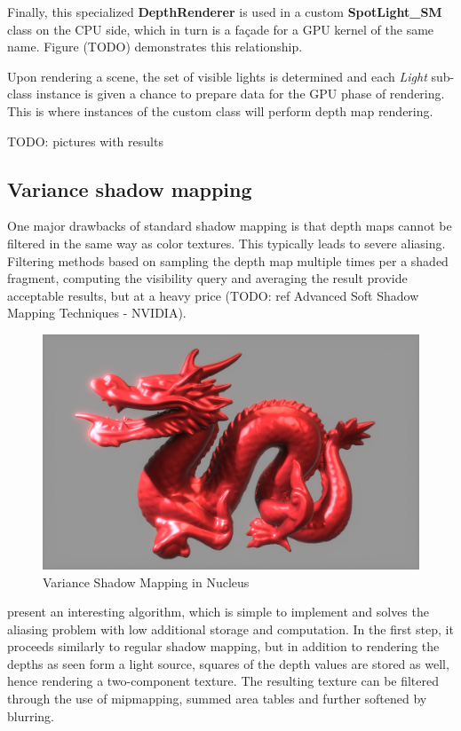Finally, this specialized \textbf{DepthRenderer} is used in a custom \textbf{SpotLight\_SM} class on the CPU side, which in turn is a façade for a GPU kernel of the same name. Figure (TODO) demonstrates this relationship.

Upon rendering a scene, the set of visible lights is determined and each \emph{Light} sub-class instance is given a chance to prepare data for the GPU phase of rendering. This is where instances of the custom class will perform depth map rendering.

TODO: pictures with results

\subsection{Variance shadow mapping}

One major drawbacks of standard shadow mapping is that depth maps cannot be filtered in the same way as color textures. This typically leads to severe aliasing. Filtering methods based on sampling the depth map multiple times per a shaded fragment, computing the visibility query and averaging the result provide acceptable results, but at a heavy price (TODO: ref Advanced Soft Shadow Mapping Techniques - NVIDIA).

\begin{figure}[h!]
  \centering
    \includegraphics[width=0.9\linewidth]{./Figures/shadowMapping/canHazDragon.jpg}
    \caption[VSM in Nucleus]{Variance Shadow Mapping in Nucleus}
  \label{fig:NucleusVSM}
\end{figure}

\citet{Donnelly06varianceshadow} present an interesting algorithm, which is simple to implement and solves the aliasing problem with low additional storage and computation. In the first step, it proceeds similarly to regular shadow mapping, but in addition to rendering the depths as seen form a light source, squares of the depth values are stored as well, hence rendering a two-component texture. The resulting texture can be filtered through the use of mipmapping, summed area tables and further softened by blurring.

